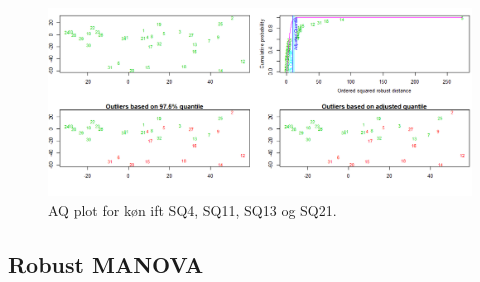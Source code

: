 %
\begin{figure}[H]
\centering
\includegraphics[width = \textwidth]{Figure/DatabehandlingSkalaer/AQplot} 
\caption{AQ plot for køn ift SQ4, SQ11, SQ13 og SQ21.}
\label{fig:AQplot}
\end{figure}
\noindent
%

\subsection{Robust MANOVA}